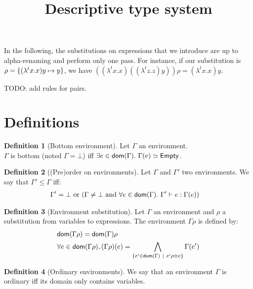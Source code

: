 \documentclass[a4paper]{article}
\title{\vspace{1.5cm}Descriptive type system}
\author{}
\date{\vspace{-5ex}}
\theoremstyle{definition}
\newtheorem{definition}{Definition}
\begin{document}
  \maketitle

  In the following, the substitutions on expressions that we introduce are up to alpha-renaming and perform only one pass.
  For instance, if our substitution is $\rho=\{(\lambda^t x. x) y \mapsto y\}$, we have $((\lambda^t x. x)((\lambda^t z. z) y))\rho = (\lambda^t x. x) y$.
  
  TODO: add rules for pairs.

    \section{Definitions}

    \begin{definition}[Bottom environment]
      Let $\Gamma$ an environment.\\
      $\Gamma$ is bottom (noted $\Gamma = \bot$) iff $\exists e\in\dom\Gamma.\ \Gamma(e)\simeq\Empty$.
    \end{definition}

      \begin{definition}[(Pre)order on environments]
        Let $\Gamma$ and $\Gamma'$ two environments. We say that $\Gamma' \leq \Gamma$ iff:
        \begin{align*}
          &\Gamma'=\bot \text{ or } (\Gamma\neq\bot \text{ and } \forall e \in \textsf{dom}(\Gamma).\ \Gamma' \vdash e : \Gamma(e))
        \end{align*}
      \end{definition}
    
      \begin{definition}[Environment substitution]
        Let $\Gamma$ an environment and $\rho$ a substitution from variables to expressions.
        The environment $\Gamma\rho$ is defined by:
        \begin{align*}
          &\textsf{dom}(\Gamma\rho) = \textsf{dom}(\Gamma) \rho\\
          &\forall e \in \textsf{dom}(\Gamma\rho), (\Gamma\rho)(e) = \bigwedge_{\{e' \in \textsf{dom}(\Gamma) ~|~ e'\rho\equiv e\}}\Gamma(e')
        \end{align*}
      \end{definition}
    
      \begin{definition}[Ordinary environments]
        We say that an environment $\Gamma$ is ordinary iff its domain only contains variables.
      \end{definition}
\end{document}
